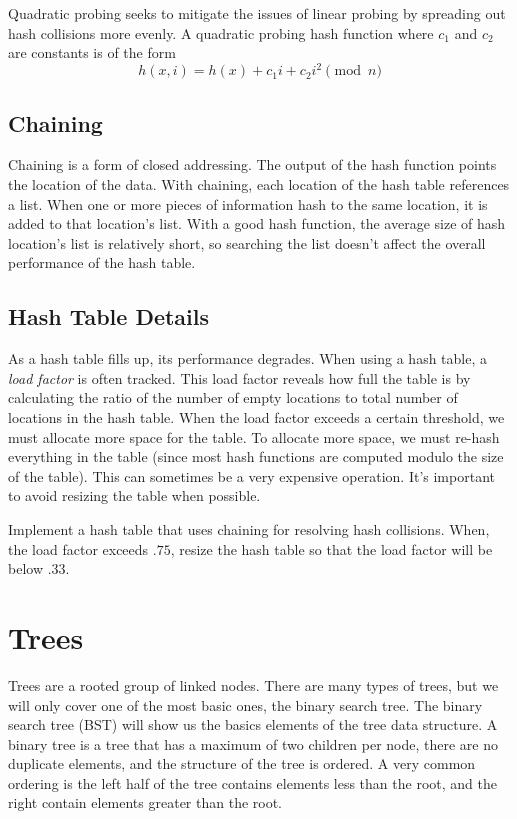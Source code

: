 Quadratic probing seeks to mitigate the issues of linear probing by spreading out hash collisions more evenly.   
A quadratic probing hash function where $c_1$ and $c_2$ are constants is of the form
\begin{equation*}
h(x, i) = h(x) + c_1i + c_2i^2 \pmod{n}
\end{equation*}

\subsection*{Chaining}
Chaining is a form of closed addressing.  The output of the hash function points the location of the data. 
With chaining, each location of the hash table references a list.
When one or more pieces of information hash to the same location, it is added to that location's list.  
With a good hash function, the average size of hash location's list is relatively short,
so searching the list doesn't affect the overall performance of the hash table.

\subsection*{Hash Table Details}
As a hash table fills up, its performance degrades.
When using a hash table, a \emph{load factor} is often tracked.
This load factor reveals how full the table is by calculating the ratio of the number of empty locations to total number of locations in the hash table.
When the load factor exceeds a certain threshold, we must allocate more space for the table.
To allocate more space, we must re-hash everything in the table (since most hash functions are computed modulo the size of the table).
This can sometimes be a very expensive operation.
It's important to avoid resizing the table when possible.

\begin{problem}
Implement a hash table that uses chaining for resolving hash collisions.
When, the load factor exceeds $.75$, resize the hash table so that the load factor will be below $.33$. 
\end{problem}

\section*{Trees}
Trees are a rooted group of linked nodes.  There are many types of trees, but we will only cover one of the most basic ones, the binary search tree.
The binary search tree (BST) will show us the basics elements of the tree data structure.
A binary tree is a tree that has a maximum of two children per node,
there are no duplicate elements, and the structure of the tree is ordered. 
A very common ordering is the left half of the tree contains elements less than the root, and the right contain elements greater than the root.

